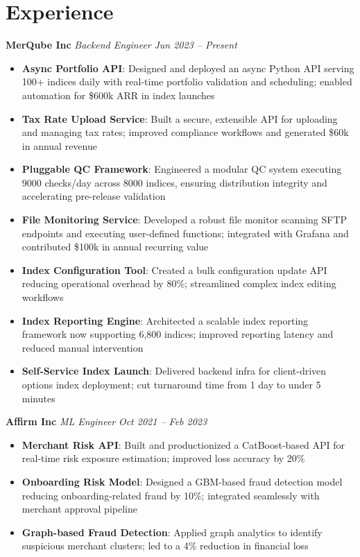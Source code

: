 \documentclass[letterpaper,10pt]{article}
\begin{document}
\section*{Experience}
\textbf{{MerQube Inc}} \textit{{Backend Engineer}} \hfill \textit{{Jun 2023 -- Present}}
\begin{itemize}
    \item \textbf{{Async Portfolio API}}: Designed and deployed an async Python API serving 100+ indices daily with real-time portfolio validation and scheduling; enabled automation for \$600k ARR in index launches
    \item \textbf{{Tax Rate Upload Service}}: Built a secure, extensible API for uploading and managing tax rates; improved compliance workflows and generated \$60k in annual revenue
    \item \textbf{{Pluggable QC Framework}}: Engineered a modular QC system executing 9000 checks/day across 8000 indices, ensuring distribution integrity and accelerating pre-release validation
    \item \textbf{{File Monitoring Service}}: Developed a robust file monitor scanning SFTP endpoints and executing user-defined functions; integrated with Grafana and contributed \$100k in annual recurring value
    \item \textbf{{Index Configuration Tool}}: Created a bulk configuration update API reducing operational overhead by 80\%; streamlined complex index editing workflows
    \item \textbf{{Index Reporting Engine}}: Architected a scalable index reporting framework now supporting 6,800 indices; improved reporting latency and reduced manual intervention
    \item \textbf{{Self-Service Index Launch}}: Delivered backend infra for client-driven options index deployment; cut turnaround time from 1 day to under 5 minutes
\end{itemize}
\textbf{{Affirm Inc}} \textit{{ML Engineer}} \hfill \textit{{Oct 2021 -- Feb 2023}}
\begin{itemize}
    \item \textbf{{Merchant Risk API}}: Built and productionized a CatBoost-based API for real-time risk exposure estimation; improved loss accuracy by 20\%
    \item \textbf{{Onboarding Risk Model}}: Designed a GBM-based fraud detection model reducing onboarding-related fraud by 10\%; integrated seamlessly with merchant approval pipeline
    \item \textbf{{Graph-based Fraud Detection}}: Applied graph analytics to identify suspicious merchant clusters; led to a 4\% reduction in financial loss
\end{itemize}
\end{document}
